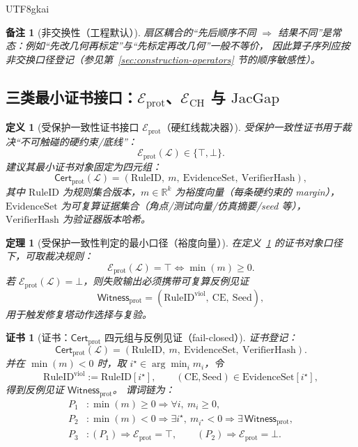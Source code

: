 \documentclass[12pt]{article}
\newtheorem{definition}{定义}[section]
\newtheorem{theorem}{定理}[section]
\newtheorem{remark}{备注}[section]
\newtheorem{Certificate}{证书}[section]
\newcommand{\RR}{\mathbb{R}}
\newcommand{\JacGap}{\ensuremath{\mathrm{JacGap}}} %
\begin{document}
\begin{CJK*}{UTF8}{gkai}
\begin{remark}[非交换性（工程默认）]
扇区耦合的“先后顺序不同 $\Rightarrow$ 结果不同”是常态：例如“先改几何再标定”与“先标定再改几何”一般不等价，
因此算子序列应按非交换口径登记（参见第~\ref{sec:construction-operators} 节的顺序敏感性）。
\end{remark}

\subsection{三类最小证书接口：$\mathcal{E}_{\mathrm{prot}}$、$\mathcal{E}_{\mathrm{CH}}$ 与 $\JacGap$}
\label{sec:eng-minimal-three-cert-interfaces}

\begin{definition}[受保护一致性证书接口 $\mathcal{E}_{\mathrm{prot}}$（硬红线裁决器）]
\label{def:eng-minimal-eprot}
受保护一致性证书用于裁决“不可触碰的硬约束/底线”：
\[
  \mathcal{E}_{\mathrm{prot}}(\mathcal{L})\in\{\top,\bot\}.
\]
建议其最小证书对象固定为四元组：
\[
  \mathsf{Cert}_{\mathrm{prot}}(\mathcal{L})=
  (\mathrm{RuleID},\ m,\ \mathrm{EvidenceSet},\ \mathrm{VerifierHash}),
\]
其中 $\mathrm{RuleID}$ 为规则集合版本，$m\in\RR^k$ 为裕度向量（每条硬约束的 margin），
$\mathrm{EvidenceSet}$ 为可复算证据集合（角点/测试向量/仿真摘要/seed 等），$\mathrm{VerifierHash}$ 为验证器版本哈希。
\end{definition}

\begin{theorem}[受保护一致性判定的最小口径（裕度向量）]
\label{thm:eng-minimal-eprot-margin}
在定义~\ref{def:eng-minimal-eprot} 的证书对象口径下，可取裁决规则：
\[
  \mathcal{E}_{\mathrm{prot}}(\mathcal{L})=\top
  \iff
  \min(m)\ge 0.
\]
若 $\mathcal{E}_{\mathrm{prot}}(\mathcal{L})=\bot$，则失败输出必须携带可复算反例见证
\[
  \mathsf{Witness}_{\mathrm{prot}}=(\mathrm{RuleID}^{\mathrm{viol}},\ \mathrm{CE},\ \mathrm{Seed}),
\]
用于触发修复塔动作选择与复验。
\end{theorem}

\begin{Certificate}[证书：$\mathsf{Cert}_{\mathrm{prot}}$ 四元组与反例见证（fail-closed）]
\label{cert:eng-minimal-eprot-margin}
证书登记：
\[
  \mathsf{Cert}_{\mathrm{prot}}(\mathcal{L})=
  (\mathrm{RuleID},\ m,\ \mathrm{EvidenceSet},\ \mathrm{VerifierHash}).
\]
并在 $\min(m)<0$ 时，取 $i^\star\in\arg\min_i m_i$，令
\[
  \mathrm{RuleID}^{\mathrm{viol}}:=\mathrm{RuleID}[i^\star],
  \qquad
  (\mathrm{CE},\mathrm{Seed})\in\mathrm{EvidenceSet}[i^\star],
\]
得到反例见证 $\mathsf{Witness}_{\mathrm{prot}}$。
谓词链为：
\[
\begin{aligned}
  P_1 &: \min(m)\ge 0\Rightarrow \forall i,\ m_i\ge 0,\\
  P_2 &: \min(m)<0\Rightarrow \exists i^\star,\ m_{i^\star}<0\Rightarrow \exists\,\mathsf{Witness}_{\mathrm{prot}},\\
  P_3 &: (P_1)\Rightarrow \mathcal{E}_{\mathrm{prot}}=\top,\qquad (P_2)\Rightarrow \mathcal{E}_{\mathrm{prot}}=\bot.
\end{aligned}
\]
\end{Certificate}


\end{CJK*}
\end{document}
